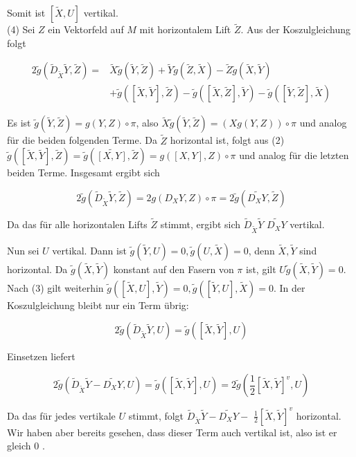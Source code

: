 \documentclass[10pt, letterpaper]{article}
\begin{document}
Somit ist $[\tilde{X}, U]$ vertikal.\\
(4) Sei $Z$ ein Vektorfeld auf $M$ mit horizontalem Lift $\tilde{Z}$. Aus der Koszulgleichung folgt

$$
\begin{aligned}
2 \tilde{g}\left(\tilde{D}_{\tilde{X}} \tilde{Y}, \tilde{Z}\right)= & \tilde{X} \tilde{g}(\tilde{Y}, \tilde{Z})+\tilde{Y} \tilde{g}(\tilde{Z}, \tilde{X})-\tilde{Z} \tilde{g}(\tilde{X}, \tilde{Y}) \\
& +\tilde{g}([\tilde{X}, \tilde{Y}], \tilde{Z})-\tilde{g}([\tilde{X}, \tilde{Z}], \tilde{Y})-\tilde{g}([\tilde{Y}, \tilde{Z}], \tilde{X})
\end{aligned}
$$

Es ist $\tilde{g}(\tilde{Y}, \tilde{Z})=g(Y, Z) \circ \pi$, also $\tilde{X} \tilde{g}(\tilde{Y}, \tilde{Z})=(X g(Y, Z)) \circ \pi$ und analog für die beiden folgenden Terme. Da $\tilde{Z}$ horizontal ist, folgt aus (2) $\tilde{g}([\tilde{X}, \tilde{Y}], \tilde{Z})=\tilde{g}(\widetilde{[X, Y]}, \tilde{Z})=g([X, Y], Z) \circ \pi$ und analog für die letzten beiden Terme. Insgesamt ergibt sich

$$
2 \tilde{g}\left(\tilde{D}_{\tilde{X}} \tilde{Y}, \tilde{Z}\right)=2 g\left(D_{X} Y, Z\right) \circ \pi=2 \tilde{g}\left(\widetilde{D_{X} Y}, \tilde{Z}\right)
$$

Da das für alle horizontalen Lifts $\tilde{Z}$ stimmt, ergibt sich $\tilde{D}_{\tilde{X}} \tilde{Y}$ $\widetilde{D_{X} Y}$ vertikal.

Nun sei $U$ vertikal. Dann ist $\tilde{g}(\tilde{Y}, U)=0, \tilde{g}(U, \tilde{X})=0$, denn $\tilde{X}, \tilde{Y}$ sind horizontal. Da $\tilde{g}(\tilde{X}, \tilde{Y})$ konstant auf den Fasern von $\pi$ ist, gilt $U \tilde{g}(\tilde{X}, \tilde{Y})=0$. Nach (3) gilt weiterhin $\tilde{g}([\tilde{X}, U], \tilde{Y})=0, \tilde{g}([\tilde{Y}, U], \tilde{X})=0$. In der Koszulgleichung bleibt nur ein Term übrig:

$$
2 \tilde{g}\left(\tilde{D}_{\tilde{X}} \tilde{Y}, U\right)=\tilde{g}([\tilde{X}, \tilde{Y}], U)
$$

Einsetzen liefert

$$
2 \tilde{g}\left(\tilde{D}_{\tilde{X}} \tilde{Y}-\widetilde{D_{X} Y}, U\right)=\tilde{g}([\tilde{X}, \tilde{Y}], U)=2 \tilde{g}\left(\frac{1}{2}[\tilde{X}, \tilde{Y}]^{v}, U\right)
$$

Da das für jedes vertikale $U$ stimmt, folgt $\tilde{D}_{\tilde{X}} \tilde{Y}-\widetilde{D_{X} Y}-$ $\frac{1}{2}[\tilde{X}, \tilde{Y}]^{v}$ horizontal. Wir haben aber bereits gesehen, dass dieser Term auch vertikal ist, also ist er gleich 0 .
\end{document}
